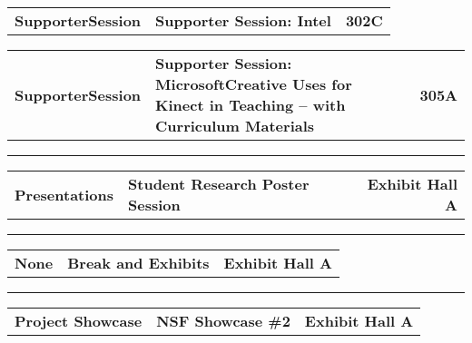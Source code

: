 \begin{longtable}[l]{@{}p{1in}@{}p{3in}@{}r}
    {\sffamily\large\textbf{SupporterSession}} & 
    {\sffamily\large\textbf{Supporter Session: Intel}} & 
    {\sffamily\large\textbf{302C}} \\
\end{longtable}    
\begin{longtable}[l]{@{}p{1in}@{}p{3in}@{}r}
    {\sffamily\large\textbf{SupporterSession}} & 
    {\sffamily\large\textbf{Supporter Session: MicrosoftCreative Uses for Kinect in Teaching – with Curriculum Materials}} & 
    {\sffamily\large\textbf{305A}} \\
\end{longtable}    
\vspace{0.5em}
\noindent\rule{5in}{0.02cm}
\vspace{0.5em}
\noindent
{}
\begin{longtable}[l]{@{}p{1in}@{}p{3in}@{}r}
    {\sffamily\large\textbf{Presentations}} & 
    {\sffamily\large\textbf{Student Research Poster Session}} & 
    {\sffamily\large\textbf{Exhibit Hall A}} \\
\end{longtable}    
\vspace{0.5em}
\noindent\rule{5in}{0.02cm}
\vspace{0.5em}
\noindent
{}
\begin{longtable}[l]{@{}p{1in}@{}p{3in}@{}r}
    {\sffamily\large\textbf{None}} & 
    {\sffamily\large\textbf{Break and Exhibits}} & 
    {\sffamily\large\textbf{Exhibit Hall A}} \\
\end{longtable}    
\vspace{0.5em}
\noindent\rule{5in}{0.02cm}
\vspace{0.5em}
\noindent
{}
\begin{longtable}[l]{@{}p{1in}@{}p{3in}@{}r}
    {\sffamily\large\textbf{Project Showcase}} & 
    {\sffamily\large\textbf{NSF Showcase \#2}} & 
    {\sffamily\large\textbf{Exhibit Hall A}} \\
\end{longtable}    
